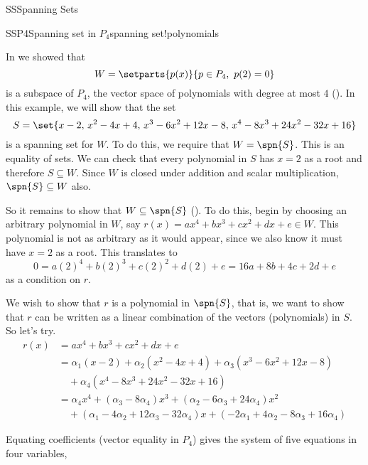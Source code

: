 \begin{subsect}{SS}{Spanning Sets}
%
\begin{example}{SSP4}{Spanning set in $P_4$}{spanning set!polynomials}
\begin{para}In  we showed that
%
\begin{equation*}
W=\setparts{p(x)}{p\in P_4,\ p(2)=0}
\end{equation*}
%
is a subspace of $P_4$, the vector space of polynomials with degree at most $4$ ().  In this example, we will show that the set
%
\begin{equation*}
S=\set{x-2,\,x^2-4x+4,\,x^3-6x^2+12x-8,\,x^4-8x^3+24x^2-32x+16}
\end{equation*}
%
is a spanning set for $W$.  To do this, we require that $W=\spn{S}$.  This is an equality of sets.  We can check that every polynomial in $S$ has $x=2$ as a root and therefore $S\subseteq W$.  Since $W$ is closed under addition and scalar multiplication, $\spn{S}\subseteq W$ also.\end{para}
%
\begin{para}So it remains to show that $W\subseteq \spn{S}$ ().  To do this, begin by choosing an arbitrary polynomial in $W$, say $r(x)=ax^4+bx^3+cx^2+dx+e\in W$.  This polynomial is not as arbitrary as it would appear, since we also know it must have $x=2$ as a root.  This translates to
%
\begin{equation*}
0=a(2)^4+b(2)^3+c(2)^2+d(2)+e=16a+8b+4c+2d+e
\end{equation*}
%
as a condition on $r$.\end{para}
%
\begin{para}We wish to show that $r$ is a polynomial in $\spn{S}$, that is, we want to show that $r$ can be written as a linear combination of the vectors (polynomials) in $S$.  So let's try.
%
\begin{align*}
r(x)&=ax^4+bx^3+cx^2+dx+e\\
&=\alpha_1\left(x-2\right)+\alpha_2\left(x^2-4x+4\right)+\alpha_3\left(x^3-6x^2+12x-8\right)\\
&\quad +\alpha_4\left(x^4-8x^3+24x^2-32x+16\right)\\
%
&=\alpha_4x^4+
\left(\alpha_3-8\alpha_4\right)x^3+
\left(\alpha_2-6\alpha_3+24\alpha_4\right)x^2\\
&\quad +
\left(\alpha_1-4\alpha_2+12\alpha_3-32\alpha_4\right)x+
\left(-2\alpha_1+4\alpha_2-8\alpha_3+16\alpha_4\right)
\end{align*}
\end{para}
%
\begin{para}Equating coefficients (vector equality in $P_4$) gives the system of five equations in four variables,

\end{para}
\end{example}
\end{subsect}
